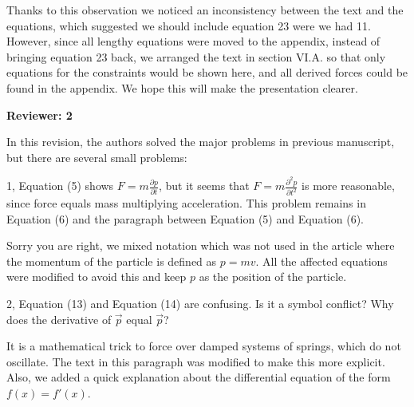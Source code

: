 \documentclass[letterpaper,12pt]{letter}
\begin{document}
Thanks to this observation we noticed an inconsistency between the text and the equations, which suggested we should include equation 23 were we had 11.  However, since all lengthy equations were moved to the appendix, instead of bringing equation 23 back, we arranged the text in section VI.A. so that only equations for the constraints would be shown here, and all derived forces could be found in the appendix.  We hope this will make the presentation clearer.


\textbf{Reviewer: 2}

{\calligra\large In this revision, the authors solved the major problems in previous manuscript, but there are several small problems:}

{\calligra\large 1, Equation (5) shows $F=m\frac{\partial p}{\partial t}$, but it seems that $F=m\frac{\partial^2 p}{\partial t^2}$ is more reasonable, since force equals mass multiplying acceleration. This problem remains in Equation (6) and the paragraph between Equation (5) and Equation (6).}

Sorry you are right, we mixed notation which was not used in the article where the momentum of the particle is defined as $p=mv$.  All the affected equations were modified to avoid this and keep $p$ as the position of the particle.

{\calligra\large 2, Equation (13) and Equation (14) are confusing. Is it a symbol conflict? Why does the derivative of $\vec{p}$ equal $\vec{p}$?}

It is a mathematical trick to force over damped systems of springs, which do not oscillate.  The text in this paragraph was modified to make this more explicit.  Also, we added a quick explanation about the differential equation of the form $f(x) = f'(x)$.
\end{document}
